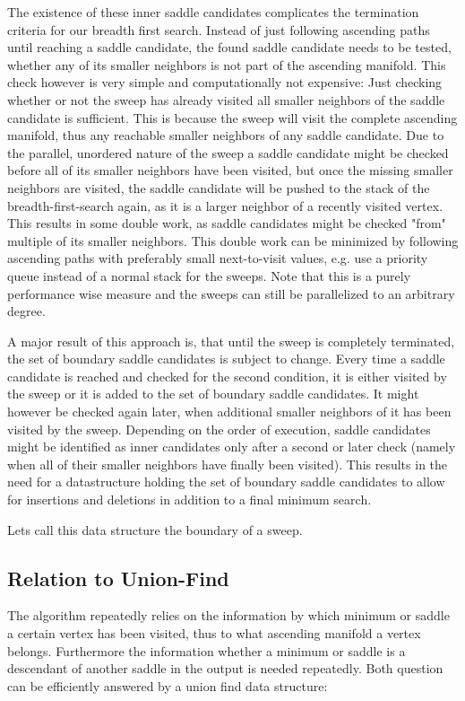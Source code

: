 \documentclass{scrartcl}
\begin{document}
The existence of these inner saddle candidates complicates the termination criteria for our breadth first search. Instead of just following ascending paths until reaching a saddle candidate, the found saddle candidate needs to be tested, whether any of its smaller neighbors is not part of the ascending manifold. This check however is very simple and computationally not expensive: Just checking whether or not the sweep has already visited all smaller neighbors of the saddle candidate is sufficient. This is because the sweep will visit the complete ascending manifold, thus any reachable smaller neighbors of any saddle candidate. Due to the parallel, unordered nature of the sweep a saddle candidate might be checked before all of its smaller neighbors have been visited, but once the missing smaller neighbors are visited, the saddle candidate will be pushed to the stack of the breadth-first-search again, as it is a larger neighbor of a recently visited vertex. This results in some double work, as saddle candidates might be checked "from" multiple of its smaller neighbors. This double work can be minimized by following ascending paths with preferably small next-to-visit values, e.g. use a priority queue instead of a normal stack for the sweeps. Note that this is a purely performance wise measure and the sweeps can still be parallelized to an arbitrary degree.

A major result of this approach is, that until the sweep is completely terminated, the set of boundary saddle candidates is subject to change. Every time a saddle candidate is reached and checked for the second condition, it is either visited by the sweep or it is added to the set of boundary saddle candidates. It might however be checked again later, when additional smaller neighbors of it has been visited by the sweep. Depending on the order of execution, saddle candidates might be identified as inner candidates only after a second or later check (namely when all of their smaller neighbors have finally been visited). This results in the need for a datastructure holding the set of boundary saddle candidates to allow for insertions and deletions in addition to a final minimum search. 

Lets call this data structure the boundary of a sweep.

\subsection{Relation to Union-Find}
The algorithm repeatedly relies on the information by which minimum or saddle a certain vertex has been visited, thus to what ascending manifold a vertex belongs. Furthermore the information whether a minimum or saddle is a descendant of another saddle in the output is needed repeatedly. Both question can be efficiently answered by a union find data structure:
\end{document}
